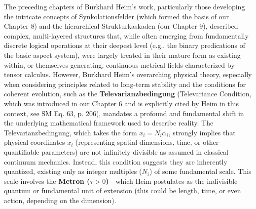 \documentclass[12pt]{article}
\newcommand{\metron}{\tau}
\begin{document}
The preceding chapters of Burkhard Heim's work, particularly those developing the intricate concepts of Synkolationsfelder (which formed the basis of our Chapter 8) and the hierarchical Strukturkaskaden (our Chapter 9), described complex, multi-layered structures that, while often emerging from fundamentally discrete logical operations at their deepest level (e.g., the binary predications of the basic aspect system), were largely treated in their mature form as existing within, or themselves generating, continuous metrical fields characterized by tensor calculus. However, Burkhard Heim’s overarching physical theory, especially when considering principles related to long-term stability and the conditions for coherent evolution, such as the \textbf{Televarianzbedingung} (Televariance Condition, which was introduced in our Chapter 6 and is explicitly cited by Heim in this context, see SM Eq. 63, p. 206), mandates a profound and fundamental shift in the underlying mathematical framework used to describe reality. The Televarianzbedingung, which takes the form \( x_i = N_i \alpha_i \), strongly implies that physical coordinates \( x_i \) (representing spatial dimensions, time, or other quantifiable parameters) are not infinitely divisible as assumed in classical continuum mechanics. Instead, this condition suggests they are inherently quantized, existing only as integer multiples (\( N_i \)) of some fundamental scale. This scale involves the \textbf{Metron (\( \metron > 0 \))}—which Heim postulates as the indivisible quantum or fundamental unit of extension (this could be length, time, or even action, depending on the dimension).
\end{document}
